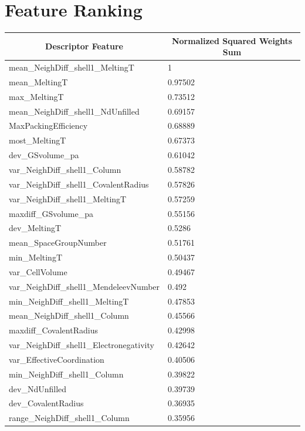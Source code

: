 \section{Feature Ranking } \label{sipfenn:appendix3}

\begin{longtable}{|l|l|}
\hline
\multicolumn{1}{|c|}{\textbf{Descriptor Feature}} & \multicolumn{1}{c|}{\textbf{Normalized Squared Weights Sum}} \\ \hline
\endfirsthead
%
\endhead
%
mean\_NeighDiff\_shell1\_MeltingT & 1 \\ \hline
mean\_MeltingT & 0.97502 \\ \hline
max\_MeltingT & 0.73512 \\ \hline
mean\_NeighDiff\_shell1\_NdUnfilled & 0.69157 \\ \hline
MaxPackingEfficiency & 0.68889 \\ \hline
most\_MeltingT & 0.67373 \\ \hline
dev\_GSvolume\_pa & 0.61042 \\ \hline
var\_NeighDiff\_shell1\_Column & 0.58782 \\ \hline
var\_NeighDiff\_shell1\_CovalentRadius & 0.57826 \\ \hline
var\_NeighDiff\_shell1\_MeltingT & 0.57259 \\ \hline
maxdiff\_GSvolume\_pa & 0.55156 \\ \hline
dev\_MeltingT & 0.5286 \\ \hline
mean\_SpaceGroupNumber & 0.51761 \\ \hline
min\_MeltingT & 0.50437 \\ \hline
var\_CellVolume & 0.49467 \\ \hline
var\_NeighDiff\_shell1\_MendeleevNumber & 0.492 \\ \hline
min\_NeighDiff\_shell1\_MeltingT & 0.47853 \\ \hline
mean\_NeighDiff\_shell1\_Column & 0.45566 \\ \hline
maxdiff\_CovalentRadius & 0.42998 \\ \hline
var\_NeighDiff\_shell1\_Electronegativity & 0.42642 \\ \hline
var\_EffectiveCoordination & 0.40506 \\ \hline
min\_NeighDiff\_shell1\_Column & 0.39822 \\ \hline
dev\_NdUnfilled & 0.39739 \\ \hline
dev\_CovalentRadius & 0.36935 \\ \hline
range\_NeighDiff\_shell1\_Column & 0.35956 \\ \hline

\end{longtable}
